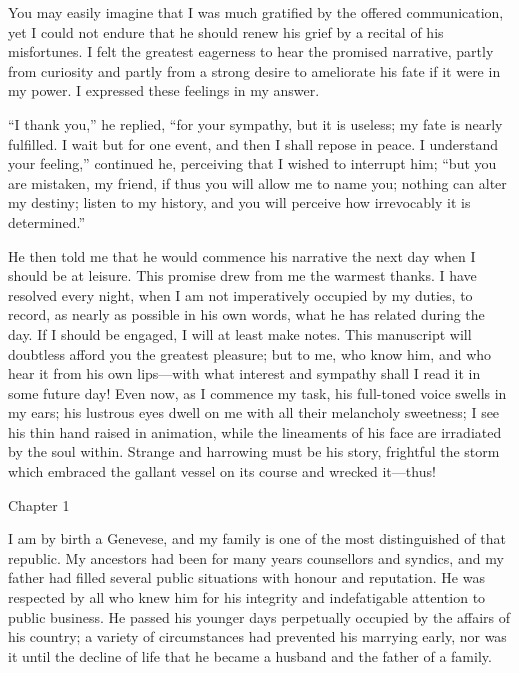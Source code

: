\documentclass[12pt,openright]{book}
\begin{document}
You may easily imagine that I was much gratified by the offered communication, yet I could not endure that he should renew his grief by a recital of his misfortunes. I felt the greatest eagerness to hear the promised narrative, partly from curiosity and partly from a strong desire to ameliorate his fate if it were in my power. I expressed these feelings in my answer.

“I thank you,” he replied, “for your sympathy, but it is useless; my fate is nearly fulfilled. I wait but for one event, and then I shall repose in peace. I understand your feeling,” continued he, perceiving that I wished to interrupt him; “but you are mistaken, my friend, if thus you will allow me to name you; nothing can alter my destiny; listen to my history, and you will perceive how irrevocably it is determined.”

He then told me that he would commence his narrative the next day when I should be at leisure. This promise drew from me the warmest thanks. I have resolved every night, when I am not imperatively occupied by my duties, to record, as nearly as possible in his own words, what he has related during the day. If I should be engaged, I will at least make notes. This manuscript will doubtless afford you the greatest pleasure; but to me, who know him, and who hear it from his own lips—with what interest and sympathy shall I read it in some future day! Even now, as I commence my task, his full-toned voice swells in my ears; his lustrous eyes dwell on me with all their melancholy sweetness; I see his thin hand raised in animation, while the lineaments of his face are irradiated by the soul within. Strange and harrowing must be his story, frightful the storm which embraced the gallant vessel on its course and wrecked it—thus!

Chapter 1

I am by birth a Genevese, and my family is one of the most distinguished of that republic. My ancestors had been for many years counsellors and syndics, and my father had filled several public situations with honour and reputation. He was respected by all who knew him for his integrity and indefatigable attention to public business. He passed his younger days perpetually occupied by the affairs of his country; a variety of circumstances had prevented his marrying early, nor was it until the decline of life that he became a husband and the father of a family.
\end{document}
